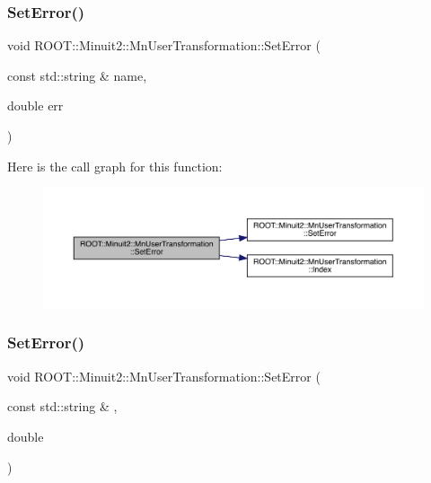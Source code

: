 \mbox{\label{classROOT_1_1Minuit2_1_1MnUserTransformation_ae63d2c7ee55629e691973082b1099e30}} 
\subsubsection{\texorpdfstring{SetError()}{SetError()}\hspace{0.1cm}{\footnotesize\ttfamily [4/6]}}
{\footnotesize\ttfamily void R\+O\+O\+T\+::\+Minuit2\+::\+Mn\+User\+Transformation\+::\+Set\+Error (\begin{DoxyParamCaption}\item[{const std\+::string \&}]{name,  }\item[{double}]{err }\end{DoxyParamCaption})}

Here is the call graph for this function\+:
\nopagebreak
\begin{figure}[H]
\begin{center}
\leavevmode
\includegraphics[width=350pt]{d9/d98/classROOT_1_1Minuit2_1_1MnUserTransformation_ae63d2c7ee55629e691973082b1099e30_cgraph}
\end{center}
\end{figure}
\mbox{\label{classROOT_1_1Minuit2_1_1MnUserTransformation_ae63d2c7ee55629e691973082b1099e30}} 
\subsubsection{\texorpdfstring{SetError()}{SetError()}\hspace{0.1cm}{\footnotesize\ttfamily [5/6]}}
{\footnotesize\ttfamily void R\+O\+O\+T\+::\+Minuit2\+::\+Mn\+User\+Transformation\+::\+Set\+Error (\begin{DoxyParamCaption}\item[{const std\+::string \&}]{,  }\item[{double}]{ }\end{DoxyParamCaption})}

